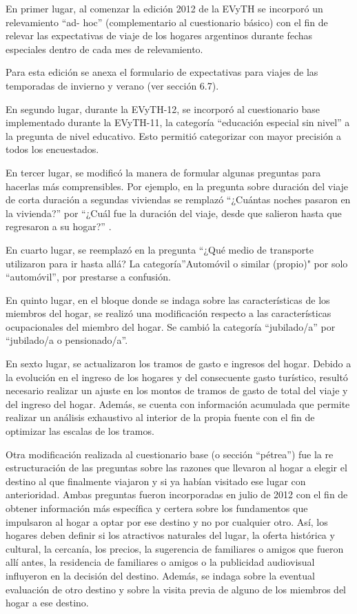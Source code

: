 \documentclass[
  openany]{book}
\begin{document}
En primer lugar, al comenzar la edición 2012 de la EVyTH se incorporó un relevamiento ``ad- hoc'' (complementario al cuestionario básico) con el fin de relevar las expectativas de viaje de los hogares argentinos durante fechas especiales dentro de cada mes de relevamiento.

Para esta edición se anexa el formulario de expectativas para viajes de las temporadas de invierno y verano (ver sección 6.7).

En segundo lugar, durante la EVyTH-12, se incorporó al cuestionario base implementado durante la EVyTH-11, la categoría ``educación especial sin nivel'' a la pregunta de nivel educativo.
Esto permitió categorizar con mayor precisión a todos los encuestados.

En tercer lugar, se modificó la manera de formular algunas preguntas para hacerlas más comprensibles.
Por ejemplo, en la pregunta sobre duración del viaje de corta duración a segundas viviendas se remplazó ``¿Cuántas noches pasaron en la vivienda?'' por ``¿Cuál fue la duración del viaje, desde que salieron hasta que regresaron a su hogar?'' .

En cuarto lugar, se reemplazó en la pregunta ``¿Qué medio de transporte utilizaron para ir hasta allá? La categoría''Automóvil o similar (propio)" por solo ``automóvil'', por prestarse a confusión.

En quinto lugar, en el bloque donde se indaga sobre las características de los miembros del hogar, se realizó una modificación respecto a las características ocupacionales del miembro del hogar.
Se cambió la categoría ``jubilado/a'' por ``jubilado/a o pensionado/a''.

En sexto lugar, se actualizaron los tramos de gasto e ingresos del hogar.
Debido a la evolución en el ingreso de los hogares y del consecuente gasto turístico, resultó necesario realizar un ajuste en los montos de tramos de gasto de total del viaje y del ingreso del hogar.
Además, se cuenta con información acumulada que permite realizar un análisis exhaustivo al interior de la propia fuente con el fin de optimizar las escalas de los tramos.

Otra modificación realizada al cuestionario base (o sección ``pétrea'') fue la re estructuración de las preguntas sobre las razones que llevaron al hogar a elegir el destino al que finalmente viajaron y si ya habían visitado ese lugar con anterioridad.
Ambas preguntas fueron incorporadas en julio de 2012 con el fin de obtener información más específica y certera sobre los fundamentos que impulsaron al hogar a optar por ese destino y no por cualquier otro.
Así, los hogares deben definir si los atractivos naturales del lugar, la oferta histórica y cultural, la cercanía, los precios, la sugerencia de familiares o amigos que fueron allí antes, la residencia de familiares o amigos o la publicidad audiovisual influyeron en la decisión del destino.
Además, se indaga sobre la eventual evaluación de otro destino y sobre la visita previa de alguno de los miembros del hogar a ese destino.
\end{document}
